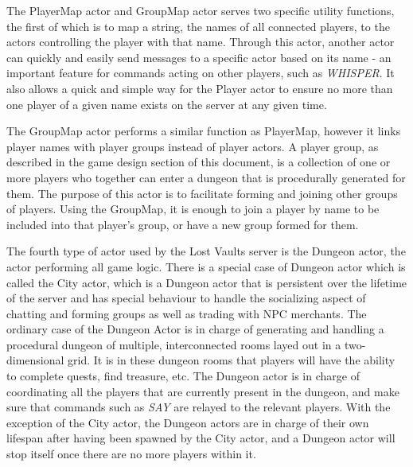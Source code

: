 \documentclass[a4paper]{article}
\begin{document}
The PlayerMap actor and GroupMap actor serves two specific utility functions, the first of which is to map a string, the names of all connected players, to the actors controlling the player 
with that name. Through this actor, another actor can quickly and easily send messages to a specific actor based on its name - an important feature for commands acting on other players, 
such as \textit{WHISPER}. It also allows a quick and simple way for the Player actor to ensure no more than one player of a given name exists on the server at any given time.

The GroupMap actor performs a similar function as PlayerMap, however it links player names with player groups instead of player actors. A player group, as described in the game design 
section of this document, is a collection of one or more players who together can enter a dungeon that is procedurally generated for them. The purpose of this actor is to facilitate 
forming and joining other groups of players. Using the GroupMap, it is enough to join a player by name to be included into that player's group, or have a new group formed for them.

The fourth type of actor used by the Lost Vaults server is the Dungeon actor, the actor performing all game logic. There is a special case of Dungeon actor which is called the City actor, 
which is a Dungeon actor that is persistent over the lifetime of the server and has special behaviour to handle the socializing aspect of chatting and forming groups as well as trading 
with NPC merchants. The ordinary case of the Dungeon Actor is in charge of generating and handling a procedural dungeon of multiple, interconnected rooms layed out in a two-dimensional 
grid. It is in these dungeon rooms that players will have the ability to complete quests, find treasure, etc. The Dungeon actor is in charge of coordinating all the players that are 
currently present in the dungeon, and make sure that commands such as \textit{SAY} are relayed to the relevant players. With the exception of the City actor, the Dungeon actors are 
in charge of their own lifespan after having been spawned by the City actor, and a Dungeon actor will stop itself once there are no more players within it.
\end{document}
